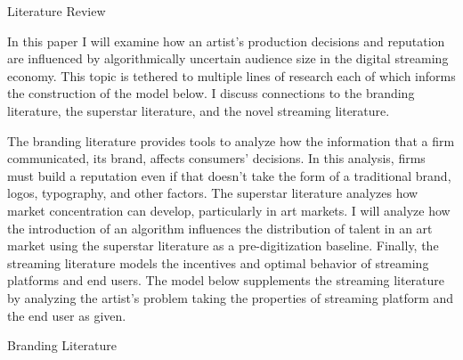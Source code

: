 \documentclass[
]{article}
\begin{document}
Literature Review

In this paper I will examine how an artist's production decisions and
reputation are influenced by algorithmically uncertain audience size in
the digital streaming economy. This topic is tethered to multiple lines
of research each of which informs the construction of the model below. I
discuss connections to the branding literature, the superstar
literature, and the novel streaming literature.

The branding literature provides tools to analyze how the information
that a firm communicated, its brand, affects consumers' decisions. In
this analysis, firms must build a reputation even if that doesn't take
the form of a traditional brand, logos, typography, and other factors.
The superstar literature analyzes how market concentration can develop,
particularly in art markets. I will analyze how the introduction of an
algorithm influences the distribution of talent in an art market using
the superstar literature as a pre-digitization baseline. Finally, the
streaming literature models the incentives and optimal behavior of
streaming platforms and end users. The model below supplements the
streaming literature by analyzing the artist's problem taking the
properties of streaming platform and the end user as given.

Branding Literature
\end{document}
